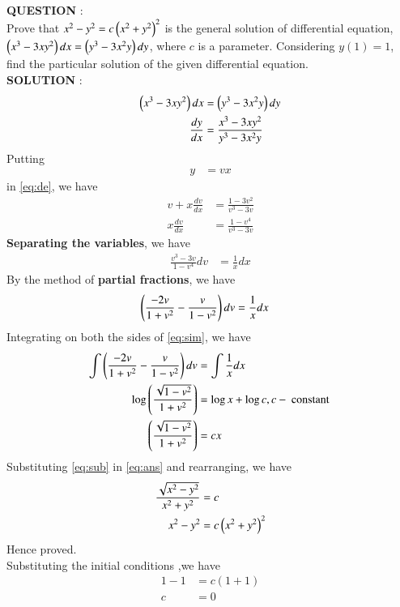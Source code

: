 \documentclass[journal]{IEEEtran}
\begin{document}
\textbf{QUESTION} : \\
Prove that $x^2 - y^2 = c\left(x^2 + y^2\right)^2$ is the general solution of differential equation, $\left(x^3 - 3xy^2\right) dx = \left(y^3 - 3x^2y\right) dy$, where $c$ is a parameter. Considering $y(1) = 1$, find the particular solution of the given differential equation.\\
\textbf{SOLUTION} : \\
\begin{align}
	\left(x^3 - 3xy^2\right) dx &= \left(y^3 - 3x^2y\right) dy \\
	\frac{dy}{dx} &= \frac{x^3 - 3xy^2}{y^3 - 3x^2y} \label{eq:de} 
\end{align}
Putting 
\begin{align}
	y &= vx \label{eq:sub}
\end{align}
in \eqref{eq:de}, we have
\begin{align}
	v + x \frac{dv}{dx} &= \frac{1 - 3v^2}{v^3 - 3v} \\
	x \frac{dv}{dx} &= \frac{1 - v^4}{v^3 - 3v}
\end{align}
\textbf{Separating the variables}, we have
\begin{align}
	\frac{v^3 - 3v}{1 - v^4} dv &= \frac{1}{x} dx 
\end{align}
By the method of \textbf{partial fractions}, we have
\begin{align}
	\left(\frac{-2v}{1 + v^2} - \frac{v}{1 - v^2}\right) dv &= \frac{1}{x} dx \label{eq:sim}
\end{align}
Integrating on both the sides of \eqref{eq:sim}, we have
\begin{align}
	\int \left(\frac{-2v}{1 + v^2} - \frac{v}{1 - v^2}\right) dv &= \int \frac{1}{x} dx \\
	\log \left(\frac{\sqrt{1 - v^2}}{1 + v^2}\right) &= \log{x} + \log{c},  c - \text{ constant } \\
	\left(\frac{\sqrt{1 - v^2}}{1 + v^2}\right) &= cx \label{eq:ans}
\end{align}
Substituting \eqref{eq:sub} in \eqref{eq:ans} and rearranging, we have
\begin{align}
	\frac{\sqrt{x^2 - y^2}}{x^2 + y^2} &= c \\
	x^2 - y^2 &= c \left(x^2 + y^2\right)^2
\end{align}
Hence proved. \\
Substituting the initial conditions ,we have \\
\begin{align}
	1 - 1 &= c(1 + 1) \\
	c &= 0
\end{align}
\end{document}
